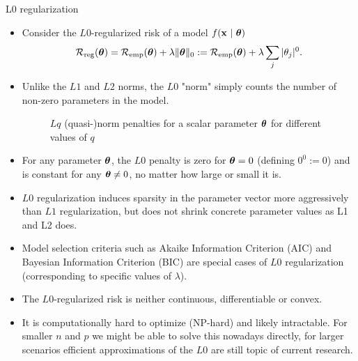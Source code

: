 \documentclass[11pt,compress,t,notes=noshow, xcolor=table]{beamer}
\begin{document}
\begin{vbframe} {L0 regularization}

  \begin{itemize}
    \item Consider the $L0$-regularized risk of a model $f(\mathbf{x} ~|~ \bm{\theta})$
  $$
  \mathcal{R}_{\text{reg}}(\bm{\theta}) = \mathcal{R}_{\text{emp}}(\bm{\theta}) + \lambda \|\bm{\theta}\|_0 := \mathcal{R}_{\text{emp}}(\bm{\theta}) + \lambda \sum_j |\theta_j|^0.
  $$
      \item Unlike the $L1$ and $L2$ norms, the $L0$ "norm" simply counts the number of non-zero parameters in the model.
      \vspace{0.3cm}
    \begin{figure}
      \centering
        \caption{\footnotesize $Lq$ (quasi-)norm penalties for a scalar parameter $\bm{\theta}$ for different values of $q$}
    \end{figure}
    \item For any parameter $\bm{\theta}$, the $L0$ penalty is zero for $\bm{\theta} = 0$ (defining $0^0 := 0$) and is constant for any $\bm{\theta} \neq 0$, no matter how large or small it is.
    \item $L0$ regularization induces sparsity in the parameter vector more aggressively than $L1$ regularization, but does not shrink concrete parameter values as L1 and L2 does.
    \item Model selection criteria such as Akaike Information Criterion (AIC) and Bayesian Information Criterion (BIC) are special cases of $L0$ regularization (corresponding to specific values of $\lambda$).
    \item The $L0$-regularized risk is neither continuous, differentiable or convex. 
    \item It is computationally hard to optimize (NP-hard) and likely intractable. 
      For smaller $n$ and $p$ we might be able to solve this nowadays directly, for larger scenarios efficient approximations of the $L0$ are still topic of current research.
  \end{itemize}
\end{vbframe}

\endlecture
\end{document}
